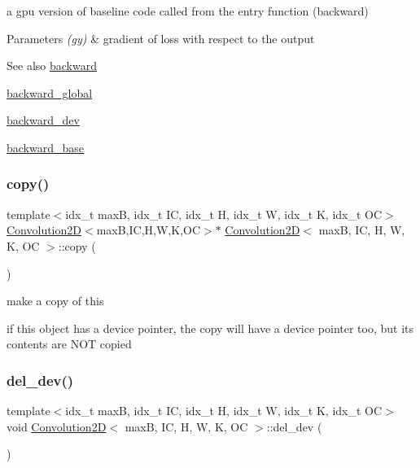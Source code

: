 a gpu version of baseline code called from the entry function (backward) 


\begin{DoxyParams}{Parameters}
{\em (gy)} & gradient of loss with respect to the output \\
\hline
\end{DoxyParams}
\begin{DoxySeeAlso}{See also}
\hyperlink{structConvolution2D_ace928f0589a42b6505f5787652ffbacd}{backward} 

\hyperlink{softmaxcrossentropy_8h_a47d56a9a23e08247b227f4aac17413e0}{backward\+\_\+global} 

\hyperlink{structConvolution2D_a144c8af173f1cbb9e7efade3b2f19f1e}{backward\+\_\+dev} 

\hyperlink{structConvolution2D_af202e85ae6c5aa5e4aae6869a8891fc3}{backward\+\_\+base} 
\end{DoxySeeAlso}
\mbox{\label{structConvolution2D_aec12842fd665f7d7a0d6d68db68f4fed}} 
\subsubsection{\texorpdfstring{copy()}{copy()}}
{\footnotesize\ttfamily template$<$idx\+\_\+t maxB, idx\+\_\+t IC, idx\+\_\+t H, idx\+\_\+t W, idx\+\_\+t K, idx\+\_\+t OC$>$ \\
\hyperlink{structConvolution2D}{Convolution2D}$<$maxB,IC,H,W,K,OC$>$$\ast$ \hyperlink{structConvolution2D}{Convolution2D}$<$ maxB, IC, H, W, K, OC $>$\+::copy (\begin{DoxyParamCaption}{ }\end{DoxyParamCaption})\hspace{0.3cm}{\ttfamily [inline]}}



make a copy of this 

if this object has a device pointer, the copy will have a device pointer too, but its contents are N\+OT copied \mbox{\label{structConvolution2D_a3f508b68dc981593f5a2980e6b88a247}} 
\subsubsection{\texorpdfstring{del\+\_\+dev()}{del\_dev()}}
{\footnotesize\ttfamily template$<$idx\+\_\+t maxB, idx\+\_\+t IC, idx\+\_\+t H, idx\+\_\+t W, idx\+\_\+t K, idx\+\_\+t OC$>$ \\
void \hyperlink{structConvolution2D}{Convolution2D}$<$ maxB, IC, H, W, K, OC $>$\+::del\+\_\+dev (\begin{DoxyParamCaption}{ }\end{DoxyParamCaption})\hspace{0.3cm}{\ttfamily [inline]}}



